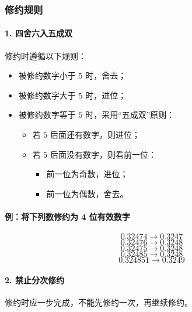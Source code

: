 \documentclass[12pt,a4paper]{article}
\numberwithin{equation}{section}
\begin{document}
\subsubsection{修约规则}

\paragraph{1. 四舍六入五成双}
修约时遵循以下规则：
\begin{itemize}
    \item 被修约数字小于 $5$ 时，舍去；
    \item 被修约数字大于 $5$ 时，进位；
    \item 被修约数字等于 $5$ 时，采用“五成双”原则：
    \begin{itemize}
        \item 若 $5$ 后面还有数字，则进位；
        \item 若 $5$ 后面没有数字，则看前一位：
        \begin{itemize}
            \item 前一位为奇数，进位；
            \item 前一位为偶数，舍去。
        \end{itemize}
    \end{itemize}
\end{itemize}

\paragraph{例：将下列数修约为 4 位有效数字}
\begin{equation}
0.32474 \rightarrow 0.3247
\end{equation}
\begin{equation}
0.32476 \rightarrow 0.3248
\end{equation}
\begin{equation}
0.32475 \rightarrow 0.3248
\end{equation}
\begin{equation}
0.32485 \rightarrow 0.3248
\end{equation}
\begin{equation}
0.324851 \rightarrow 0.3249
\end{equation}

\paragraph{2. 禁止分次修约}
修约时应一步完成，不能先修约一次，再继续修约。
\end{document}
